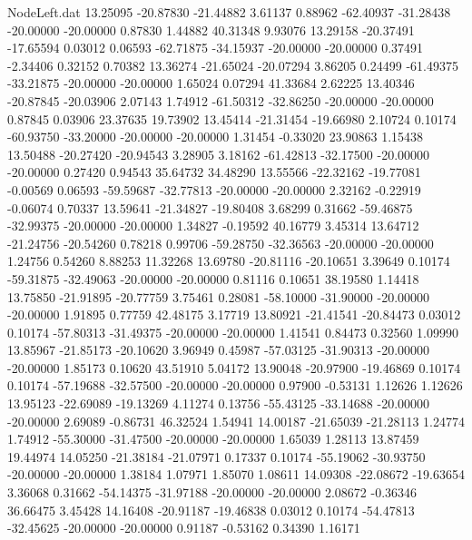 \begin{filecontents}{NodeLeft.dat}
  13.25095  -20.87830  -21.44882     3.61137    0.88962  -62.40937  -31.28438  -20.00000  -20.00000    0.87830    1.44882   40.31348    9.93076
  13.29158  -20.37491  -17.65594     0.03012    0.06593  -62.71875  -34.15937  -20.00000  -20.00000    0.37491   -2.34406    0.32152    0.70382
  13.36274  -21.65024  -20.07294     3.86205    0.24499  -61.49375  -33.21875  -20.00000  -20.00000    1.65024    0.07294   41.33684    2.62225
  13.40346  -20.87845  -20.03906     2.07143    1.74912  -61.50312  -32.86250  -20.00000  -20.00000    0.87845    0.03906   23.37635   19.73902
  13.45414  -21.31454  -19.66980     2.10724    0.10174  -60.93750  -33.20000  -20.00000  -20.00000    1.31454   -0.33020   23.90863    1.15438
  13.50488  -20.27420  -20.94543     3.28905    3.18162  -61.42813  -32.17500  -20.00000  -20.00000    0.27420    0.94543   35.64732   34.48290
  13.55566  -22.32162  -19.77081    -0.00569    0.06593  -59.59687  -32.77813  -20.00000  -20.00000    2.32162   -0.22919   -0.06074    0.70337
  13.59641  -21.34827  -19.80408     3.68299    0.31662  -59.46875  -32.99375  -20.00000  -20.00000    1.34827   -0.19592   40.16779    3.45314
  13.64712  -21.24756  -20.54260     0.78218    0.99706  -59.28750  -32.36563  -20.00000  -20.00000    1.24756    0.54260    8.88253   11.32268
  13.69780  -20.81116  -20.10651     3.39649    0.10174  -59.31875  -32.49063  -20.00000  -20.00000    0.81116    0.10651   38.19580    1.14418
  13.75850  -21.91895  -20.77759     3.75461    0.28081  -58.10000  -31.90000  -20.00000  -20.00000    1.91895    0.77759   42.48175    3.17719
  13.80921  -21.41541  -20.84473     0.03012    0.10174  -57.80313  -31.49375  -20.00000  -20.00000    1.41541    0.84473    0.32560    1.09990
  13.85967  -21.85173  -20.10620     3.96949    0.45987  -57.03125  -31.90313  -20.00000  -20.00000    1.85173    0.10620   43.51910    5.04172
  13.90048  -20.97900  -19.46869     0.10174    0.10174  -57.19688  -32.57500  -20.00000  -20.00000    0.97900   -0.53131    1.12626    1.12626
  13.95123  -22.69089  -19.13269     4.11274    0.13756  -55.43125  -33.14688  -20.00000  -20.00000    2.69089   -0.86731   46.32524    1.54941
  14.00187  -21.65039  -21.28113     1.24774    1.74912  -55.30000  -31.47500  -20.00000  -20.00000    1.65039    1.28113   13.87459   19.44974
  14.05250  -21.38184  -21.07971     0.17337    0.10174  -55.19062  -30.93750  -20.00000  -20.00000    1.38184    1.07971    1.85070    1.08611
  14.09308  -22.08672  -19.63654     3.36068    0.31662  -54.14375  -31.97188  -20.00000  -20.00000    2.08672   -0.36346   36.66475    3.45428
  14.16408  -20.91187  -19.46838     0.03012    0.10174  -54.47813  -32.45625  -20.00000  -20.00000    0.91187   -0.53162    0.34390    1.16171

\end{filecontents}
